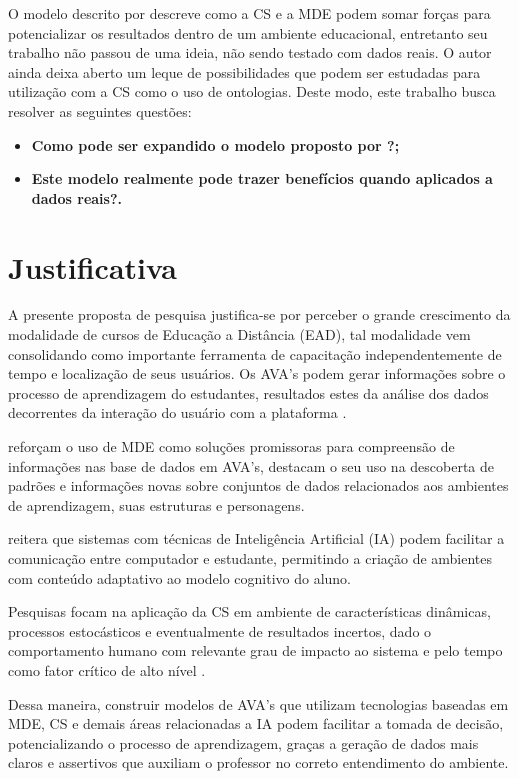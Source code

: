\documentclass[
	oneside,
	12pt,				%
	a4paper,			%
	english,			%
	brazil,				%
	article
	]{abntex2}
\begin{document}
O modelo descrito por  descreve como a CS e a MDE podem somar forças para potencializar os resultados dentro de um ambiente educacional, entretanto seu trabalho não passou de uma ideia, não sendo testado com dados reais. O autor ainda deixa aberto um leque de possibilidades que podem ser estudadas para utilização com a CS como o uso de ontologias. Deste modo, este trabalho busca resolver as seguintes questões:

\begin{itemize}	
	\item \textbf{Como pode ser expandido o modelo proposto por ?;}
	\item \textbf{Este modelo realmente pode trazer benefícios quando aplicados a dados reais?.}	 
\end{itemize}

\section{Justificativa}

A presente proposta de pesquisa justifica-se por perceber o grande crescimento da modalidade de cursos de Educação a Distância (EAD), tal modalidade vem consolidando como importante ferramenta de capacitação independentemente de tempo e localização de seus usuários. Os AVA's podem gerar informações sobre o processo de aprendizagem do estudantes, resultados estes da análise dos dados decorrentes da interação do usuário com a plataforma \cite{Fernandes2017}.

 reforçam o uso de MDE como soluções promissoras para compreensão de informações nas base de dados em AVA’s, \cite{Rabelo_et_al2017} destacam o seu uso na descoberta de padrões e informações novas sobre conjuntos de dados relacionados aos ambientes de aprendizagem, suas estruturas e personagens.

 reitera que sistemas com técnicas de Inteligência Artificial (IA) podem facilitar a comunicação entre computador e estudante, permitindo a criação de ambientes com conteúdo adaptativo ao modelo cognitivo do aluno. 

Pesquisas focam na aplicação da CS em ambiente de características dinâmicas, processos estocásticos e eventualmente de resultados incertos, dado o comportamento humano com relevante grau de impacto ao sistema e pelo tempo como fator crítico de alto nível \cite{Berti2017}.

Dessa maneira, construir modelos de AVA's que utilizam tecnologias baseadas em MDE, CS e demais áreas relacionadas  a IA podem facilitar a tomada de decisão, potencializando o processo de aprendizagem, graças a geração de dados mais claros e assertivos que auxiliam o professor no correto entendimento do ambiente.
\end{document}
